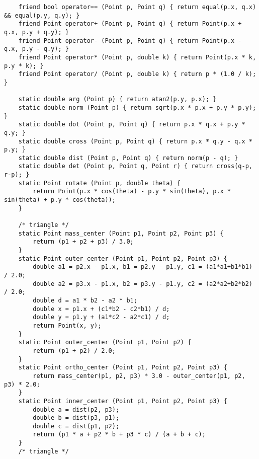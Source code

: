 \documentclass[10pt,landscape]{article}
\begin{document}
\begin{multicols}{2}
\begin{lstlisting}
	friend bool operator== (Point p, Point q) { return equal(p.x, q.x) && equal(p.y, q.y); }
	friend Point operator+ (Point p, Point q) { return Point(p.x + q.x, p.y + q.y); }
	friend Point operator- (Point p, Point q) { return Point(p.x - q.x, p.y - q.y); }
	friend Point operator* (Point p, double k) { return Point(p.x * k, p.y * k); }
	friend Point operator/ (Point p, double k) { return p * (1.0 / k); }

	static double arg (Point p) { return atan2(p.y, p.x); }
	static double norm (Point p) { return sqrt(p.x * p.x + p.y * p.y); }
	static double dot (Point p, Point q) { return p.x * q.x + p.y * q.y; }
	static double cross (Point p, Point q) { return p.x * q.y - q.x * p.y; }
	static double dist (Point p, Point q) { return norm(p - q); }
	static double det (Point p, Point q, Point r) { return cross(q-p, r-p); }
	static Point rotate (Point p, double theta) {
		return Point(p.x * cos(theta) - p.y * sin(theta), p.x * sin(theta) + p.y * cos(theta));
	}

	/* triangle */
	static Point mass_center (Point p1, Point p2, Point p3) {
		return (p1 + p2 + p3) / 3.0;
	}
	static Point outer_center (Point p1, Point p2, Point p3) {
		double a1 = p2.x - p1.x, b1 = p2.y - p1.y, c1 = (a1*a1+b1*b1) / 2.0;
		double a2 = p3.x - p1.x, b2 = p3.y - p1.y, c2 = (a2*a2+b2*b2) / 2.0;
		double d = a1 * b2 - a2 * b1;
		double x = p1.x + (c1*b2 - c2*b1) / d;
		double y = p1.y + (a1*c2 - a2*c1) / d;
		return Point(x, y);
	}
	static Point outer_center (Point p1, Point p2) {
		return (p1 + p2) / 2.0;
	}
	static Point ortho_center (Point p1, Point p2, Point p3) {
		return mass_center(p1, p2, p3) * 3.0 - outer_center(p1, p2, p3) * 2.0;
	}
	static Point inner_center (Point p1, Point p2, Point p3) {
		double a = dist(p2, p3);
		double b = dist(p3, p1);
		double c = dist(p1, p2);
		return (p1 * a + p2 * b + p3 * c) / (a + b + c);
	}
	/* triangle */


\end{lstlisting}
\end{multicols}
\end{document}
